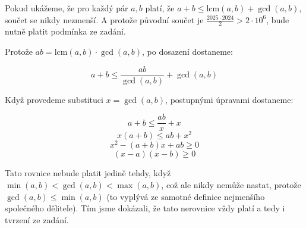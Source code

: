 \documentclass{fkssolpub}
\author{Ondřej Sedláček}
\newcommand{\lcm}{\text{lcm}}
\begin{document}
Pokud ukážeme, že pro každý pár $a,b$ platí, že $a + b \leq \lcm (a,b) + \gcd(a,b)$, součet se nikdy nezmenší. A protože původní součet je $\frac{2025 \cdot 2024}{2} > 2 \cdot 10^6$, bude nutně platit podmínka ze zadání.

Protože $a b = \lcm (a,b) \cdot \gcd(a,b)$, po dosazení dostaneme:

\[
  a + b \leq \frac{a b}{\gcd (a,b)} + \gcd(a,b)
\]

Když provedeme substituci $x = \gcd(a,b)$, postupnými úpravami dostaneme:

\[
  a + b \leq \frac{ab}{x} + x
\]
\[
  x (a + b) \leq ab + x^2
\]
\[
  x^2 - (a + b) x + ab \geq 0
\]
\[
  (x - a)(x - b) \geq 0
\]

Tato rovnice nebude platit jedině tehdy, když $\min(a,b) < \gcd(a,b) < \max(a,b)$, což ale nikdy nemůže nastat, protože $\gcd(a,b) \leq \min(a,b)$ (to vyplývá ze samotné definice nejmenšího společného dělitele). Tím jsme dokázali, že tato nerovnice vždy platí a tedy i tvrzení ze zadání.
\end{document}

